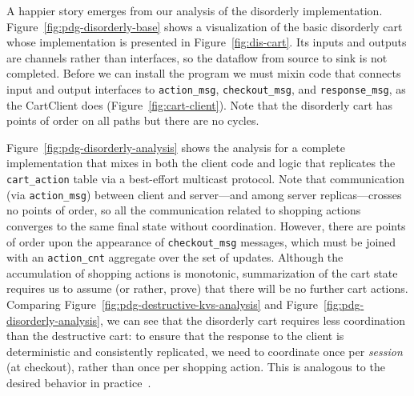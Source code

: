 A happier story emerges from our analysis of the disorderly implementation.
Figure~\ref{fig:pdg-disorderly-base} shows a visualization of the basic
disorderly cart whose implementation is presented in Figure~\ref{fig:dis-cart}.
Its inputs and outputs are channels rather than interfaces, so the dataflow from
source to sink is not completed.  Before we can install the program we must
mixin code that connects input and output interfaces to \texttt{action\_msg},
\texttt{checkout\_msg}, and \texttt{response\_msg}, as the CartClient does
(Figure~\ref{fig:cart-client}).  Note that the disorderly cart has points of
order on all paths but there are no cycles.

Figure~\ref{fig:pdg-disorderly-analysis} shows the analysis for a complete
implementation that mixes in both the client code and logic that replicates the
\texttt{cart\_action} table via a best-effort multicast protocol.  Note that
communication (via \texttt{action\_msg}) between client and server---and among
server replicas---crosses no points of order, so all the communication related
to shopping actions converges to the same final state without coordination.
However, there are points of order upon the appearance of \texttt{checkout\_msg}
messages, which must be joined with an \texttt{action\_cnt} aggregate over the
set of updates.  Although the accumulation of shopping actions is monotonic,
summarization of the cart state requires us to assume (or rather, prove) that
there will be no further cart actions.
Comparing Figure~\ref{fig:pdg-destructive-kvs-analysis} and
Figure~\ref{fig:pdg-disorderly-analysis}, we can see that the disorderly cart
requires less coordination than the destructive cart: to ensure that the
response to the client is deterministic and consistently replicated, we need to
coordinate once per {\em session} (at checkout), rather than once per shopping
action.  This is analogous to the desired behavior in practice~\cite{quicksand}.
%

